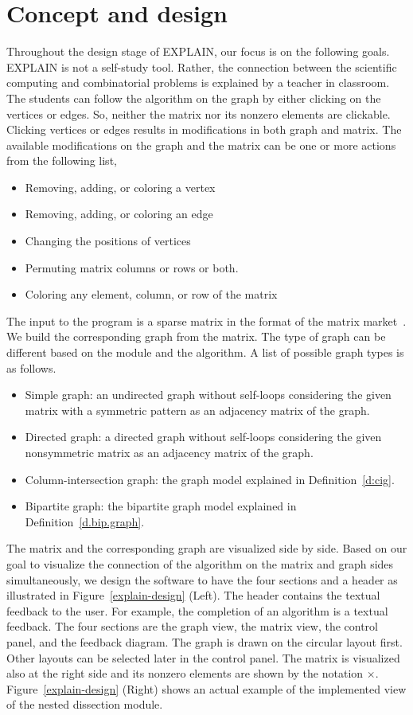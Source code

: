\documentclass[12pt, twoside,a4paper,toc=bibliography]{scrbook}
\newcommand{\figref}[1]{Figure~\protect\ref{#1}}
\newcommand{\defref}[1]{Definition~\protect\ref{#1}}
\begin{document}
\section{Concept and design}
\label{s.concept}
Throughout the design stage of \mbox{EXPLAIN}, our focus is on the following goals.
\mbox{EXPLAIN} is not a self-study tool.
Rather, the connection between the scientific computing
and combinatorial problems is explained by a teacher in classroom.
The students can follow the algorithm on the graph by either
clicking on the vertices or edges.
So, neither the matrix nor its nonzero elements are clickable.
Clicking vertices or edges results in modifications in both graph and matrix.
The available modifications on the graph and the matrix can be one or more actions
from the following list,
\begin{itemize}
\item Removing, adding, or coloring a vertex
\item Removing, adding, or coloring an edge
\item Changing the positions of vertices
\item Permuting matrix columns or rows or both.
\item Coloring any element, column, or row of the matrix
\end{itemize}

The input to the program is a sparse matrix in the format of the matrix market~\cite{matrix-market}.
We build the corresponding graph from the matrix.
The type of graph can be different based on the module and the algorithm.
A list of possible graph types is as follows.
\begin{itemize}
\item Simple graph: an undirected graph without self-loops considering
the given matrix with a symmetric pattern as an adjacency matrix of the graph.
\item Directed graph: a directed graph without self-loops considering
the given nonsymmetric matrix as an adjacency matrix of the graph.
\item Column-intersection graph: the graph model explained in \defref{d:cig}.
\item Bipartite graph: the bipartite graph model explained in \defref{d.bip.graph}.
\end{itemize}
The matrix and the corresponding graph are visualized side by side.
Based on our goal to visualize the connection of the algorithm on the matrix and graph sides simultaneously,
we design the software to have the four sections and a header as illustrated in \figref{explain-design} (Left).
The header contains the textual feedback to the user. For example, the completion of an algorithm is a textual feedback.
The four sections are the graph view, the matrix view, the control panel, and the feedback diagram.
The graph is drawn on the circular layout first. Other layouts can be selected later
in the control panel. The matrix is visualized also at the right side and
its nonzero elements are shown by the notation $\times$.
\figref{explain-design} (Right) shows an actual example of the implemented view of
the nested dissection module.
\end{document}

